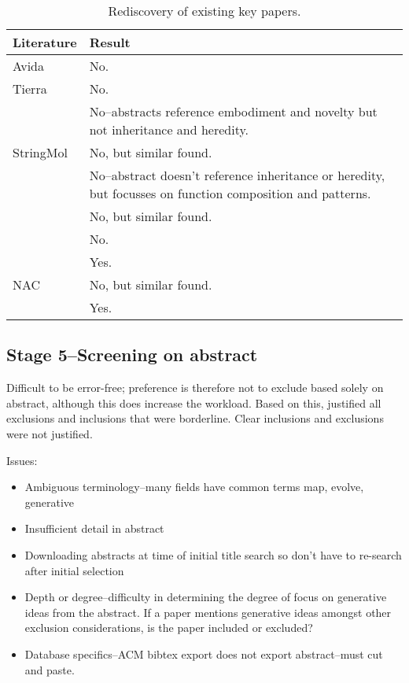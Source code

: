 \begin{table*}
	\footnotesize
	\begin{center}
		\begin{tabular}{@{}lp{6cm}@{}}
		\toprule	
		Literature & Result \\
		\midrule		
		Avida \cite{Ofria2004}&No.\\
		Tierra \cite{Ray1991} &No.\\
		\cite{Nellis2012}\cite{Nellis2014} & No--abstracts reference embodiment and novelty but not inheritance and heredity.\\
		StringMol \cite{Hickinbotham2012}   & No, but similar found.\\
		\cite{Fontana1992}	& No--abstract doesn't reference inheritance or heredity, but focusses on function composition and patterns.\\
		\cite{Dittrich1998}	& No, but similar found.	\\
		\cite{Nowostawski2005} & No.\\
		\cite{Fenizio2000}\cite{Fenizio2001} & Yes.	\\		
		NAC \cite{Suzuki2006}    & No, but similar found.\\
		\cite{Gardiner2007}  & Yes.\\
		\bottomrule
	\end{tabular}
\end{center}
\caption{Rediscovery of existing key papers.}
\end{table*}

\subsection{Stage 5--Screening on abstract}
Difficult to be error-free; preference is therefore not to exclude based solely on abstract, although this does increase the workload.
Based on this, justified all exclusions and inclusions that were borderline. Clear inclusions and exclusions were not justified.

Issues:
\begin{itemize}
	\item Ambiguous terminology--many fields have common terms \eg map, evolve, generative
	\item Insufficient detail in abstract
	\item Downloading abstracts at time of initial title search so don't have to re-search after initial selection
	\item Depth or degree--difficulty in determining the degree of focus on generative ideas from the abstract. If a paper mentions generative ideas amongst other exclusion considerations, is the paper included or excluded?
	\item Database specifics--ACM bibtex export does not export abstract--must cut and paste. 
\end{itemize}

